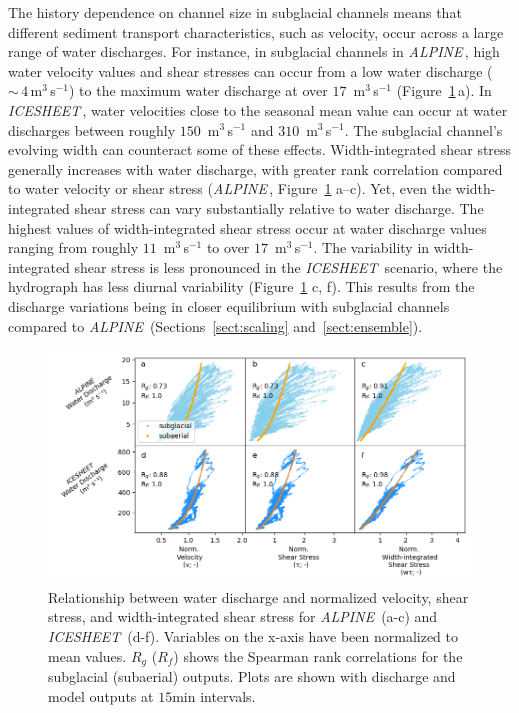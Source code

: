 \documentclass[tc, manuscript]{copernicus}
\newcommand{\alpine}{\textit{ALPINE}\,}
\newcommand{\icesheet}{\textit{ICESHEET}\,}
\begin{document}
The history dependence on channel size in subglacial channels means that different sediment transport characteristics, such as velocity, occur across a large range of water discharges.
For instance, in subglacial channels in \alpine{},  high water velocity values and shear stresses can occur from a low water discharge  ($\sim\,4$\,\unit{m}$^3$\,\unit{s}$^{-1}$) to the maximum water discharge at over $17$ \,\unit{m}$^3$\,\unit{s}$^{-1}$ (Figure~\ref{fig:Qw_vari}\,a).
In \icesheet{}, water velocities close to the seasonal mean value can occur at water discharges between roughly $150$ \,\unit{m}$^3$\,\unit{s}$^{-1}$ and $310$ \,\unit{m}$^3$\,\unit{s}$^{-1}$.
The subglacial channel's evolving width can counteract some of these effects.
Width-integrated shear stress generally increases with water discharge, with greater rank correlation compared to water velocity or shear stress (\alpine{}, Figure~\ref{fig:Qw_vari} a--c).
Yet, even the width-integrated shear stress can vary substantially relative to water discharge.
The highest values of width-integrated shear stress occur at water discharge values ranging from roughly $11$ \,\unit{m}$^3$\,\unit{s}$^{-1}$ to over $17$ \,\unit{m}$^3$\,\unit{s}$^{-1}$.
The variability in width-integrated shear stress is less pronounced in the \icesheet{} scenario, where the hydrograph has less diurnal variability (Figure~\ref{fig:Qw_vari} c, f).
This results from the discharge variations being in closer equilibrium with subglacial channels compared to \alpine{} (Sections~\ref{sect:scaling} and~\ref{sect:ensemble}).

\begin{figure}[hbt!]
  \centering
  \includegraphics[width=0.8\linewidth]{Fig3.png}
  \caption{
    Relationship between water discharge and normalized velocity, shear stress, and width-integrated shear stress for \alpine{} (a-c) and \icesheet{} (d-f).
    Variables on the x-axis have been normalized to mean values.
    $R_g$ ($R_f$) shows the Spearman rank correlations for the subglacial (subaerial) outputs.
    Plots are shown with discharge and model outputs at $15$\unit{min} intervals.
  }
  \label{fig:Qw_vari}
\end{figure}
\end{document}

